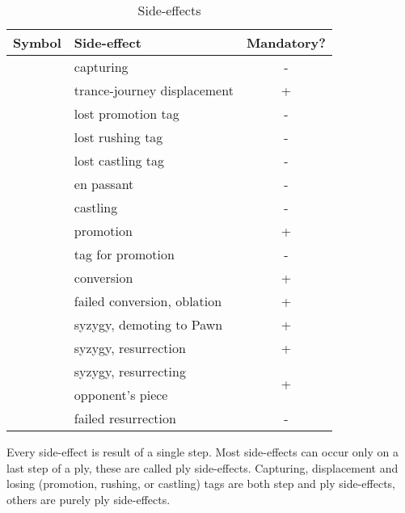 \begin{table}[!h]
\centering
\begin{tabular}{ rlc }
\toprule
\textbf{Symbol}             & \textbf{Side-effect}          & \textbf{Mandatory?}   \\
\midrule
\alg{*}                     & capturing                     & -                     \\
\alg{<}                     & trance-journey displacement   & +                     \\ \cmidrule{1-3}
\alg{==}                    & lost promotion tag            & -                     \\
\alg{::}                    & lost rushing tag              & -                     \\
\alg{\&\&}                  & lost castling tag             & -                     \\ \cmidrule{1-3}
\alg{:}                     & en passant                    & -                     \\
\alg{\&}                    & castling                      & -                     \\
\alg{=}                     & promotion                     & +                     \\
\alg{=}                     & tag for promotion             & -                     \\
\alg{\%}                    & conversion                    & +                     \\
\alg{\%\%}                  & failed conversion, oblation   & +                     \\
\alg{>}                     & syzygy, demoting to Pawn      & +                     \\
\alg{\$}                    & syzygy, resurrection          & +                     \\ \cmidrule{1-3}
\multirow{2}{*}{\alg{\$\$}} & syzygy, resurrecting          & \multirow{2}{*}{+}    \\
                            & opponent's piece              &                       \\ \cmidrule{1-3}
\alg{\$\$\$}                & failed resurrection           & -                     \\
\bottomrule
\end{tabular}
\caption{Side-effects}
\label{tbl:Appendix/Summary/Side-effects}
\end{table}

Every side-effect is result of a single step. Most side-effects can occur only on a last step of
a ply, these are called ply side-effects. Capturing, displacement and losing (promotion, rushing,
or castling) tags are both step and ply side-effects, others are purely ply side-effects.

